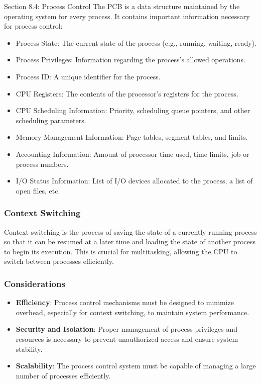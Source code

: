 \begin{notes}{Section 8.4: Process Control}
    The PCB is a data structure maintained by the operating system for every process. It contains important information necessary for process control:
    
    \begin{itemize}
        \item Process State: The current state of the process (e.g., running, waiting, ready).
        \item Process Privileges: Information regarding the process's allowed operations.
        \item Process ID: A unique identifier for the process.
        \item CPU Registers: The contents of the processor's registers for the process.
        \item CPU Scheduling Information: Priority, scheduling queue pointers, and other scheduling parameters.
        \item Memory-Management Information: Page tables, segment tables, and limits.
        \item Accounting Information: Amount of processor time used, time limits, job or process numbers.
        \item I/O Status Information: List of I/O devices allocated to the process, a list of open files, etc.
    \end{itemize}
    
    \subsubsection*{Context Switching}
    
    Context switching is the process of saving the state of a currently running process so that it can be resumed at a later time and loading the state of another process to begin its execution. This 
    is crucial for multitasking, allowing the CPU to switch between processes efficiently.
    
    \subsubsection*{Considerations}
    
    \begin{itemize}
        \item \textbf{Efficiency}: Process control mechanisms must be designed to minimize overhead, especially for context switching, to maintain system performance.
        \item \textbf{Security and Isolation}: Proper management of process privileges and resources is necessary to prevent unauthorized access and ensure system stability.
        \item \textbf{Scalability}: The process control system must be capable of managing a large number of processes efficiently.
    \end{itemize}    
\end{notes}